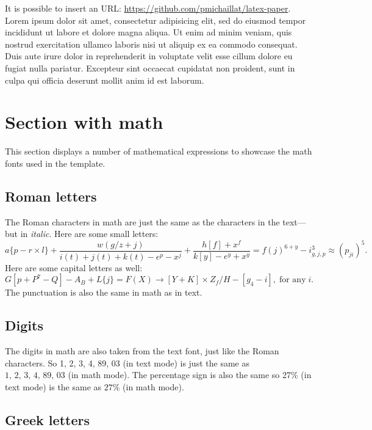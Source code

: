 \documentclass[letterpaper,11pt,leqno]{article}
\begin{document}
It is possible to insert an URL: \url{https://github.com/pmichaillat/latex-paper}. Lorem ipsum dolor sit amet, consectetur adipisicing elit, sed do eiusmod
tempor incididunt ut labore et dolore magna aliqua. Ut enim ad minim veniam,
quis nostrud exercitation ullamco laboris nisi ut aliquip ex ea commodo
consequat. Duis aute irure dolor in reprehenderit in voluptate velit esse
cillum dolore eu fugiat nulla pariatur. Excepteur sint occaecat cupidatat non
proident, sunt in culpa qui officia deserunt mollit anim id est laborum.

\section{Section with math}\label{s:math}

This section displays a number of mathematical expressions to showcase the math fonts used in the template.

\subsection{Roman letters} 

The Roman characters in math are just the same as the characters in the text---but in \textit{italic}. Here are some small letters: 
\begin{equation*}
a\{p - r \times l\} + \frac{w(g/z+j)}{i(t)+j(t)+k(t) - e^p - x^j} + \frac{h[f]+x^f}{k[y]-e^y + x^y} = f(j)^{6+y} - i^3_{g,j,p} \approx (p_{ji})^5.
\end{equation*}
Here are some capital letters as well: 
\begin{equation*}
G[p + P^7-Q] - A_B + L\{j\} = F(X) \to [Y+K]\times Z_f/H - [g_4 - i],\;\text{for any}\;i.
\end{equation*}
The punctuation is also the same in math as in text. 

\subsection{Digits} 

The digits in math are also taken from the text font, just like the Roman characters. So 1, 2, 3, 4, 89, 03 (in text mode) is just the same as $1,\,2,\,3,\,4,\,89,\,03$ (in math mode). The percentage sign is also the same so 27\% (in text mode) is the same as $27\%$ (in math mode).

\subsection{Greek letters}
\end{document}
